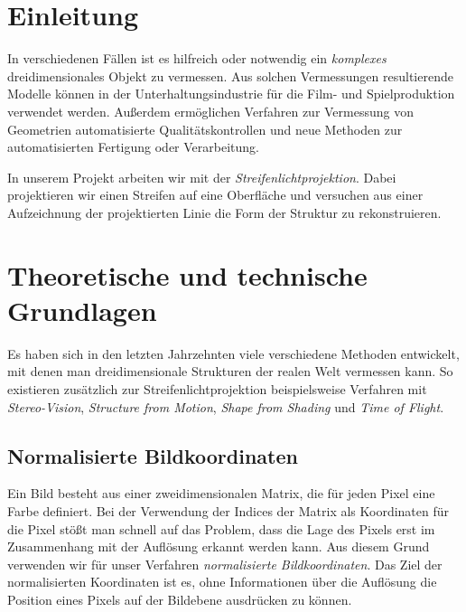 \documentclass[ngerman,a4paper]{scrartcl}
\begin{document}


\tableofcontents
\newpage


\section{Einleitung}

In verschiedenen Fällen ist es hilfreich oder notwendig ein \emph{komplexes} dreidimensionales Objekt zu vermessen. Aus solchen Vermessungen resultierende Modelle können in der Unterhaltungsindustrie für die Film- und Spielproduktion verwendet werden. Außerdem ermöglichen Verfahren zur Vermessung von Geometrien automatisierte Qualitätskontrollen und neue Methoden zur automatisierten Fertigung oder Verarbeitung.

In unserem Projekt arbeiten wir mit der \emph{Streifenlichtprojektion}. Dabei projektieren wir einen Streifen auf eine Oberfläche und versuchen aus einer Aufzeichnung der projektierten Linie die Form der Struktur zu rekonstruieren.


\section{Theoretische und technische Grundlagen}

Es haben sich in den letzten Jahrzehnten viele verschiedene Methoden entwickelt, mit denen man dreidimensionale Strukturen der realen Welt vermessen kann. So existieren zusätzlich zur Streifenlichtprojektion beispielsweise Verfahren mit \emph{Stereo-Vision}, \emph{Structure from Motion}, \emph{Shape from Shading} und \emph{Time of Flight}.

\subsection{Normalisierte Bildkoordinaten}

Ein Bild besteht aus einer zweidimensionalen Matrix, die für jeden Pixel eine Farbe definiert. Bei der Verwendung der Indices der Matrix als Koordinaten für die Pixel stößt man schnell auf das Problem, dass die Lage des Pixels erst im Zusammenhang mit der Auflösung erkannt werden kann. Aus diesem Grund verwenden wir für unser Verfahren \emph{normalisierte Bildkoordinaten}. Das Ziel der normalisierten Koordinaten ist es, ohne Informationen über die Auflösung die Position eines Pixels auf der Bildebene ausdrücken zu können.
\end{document}

